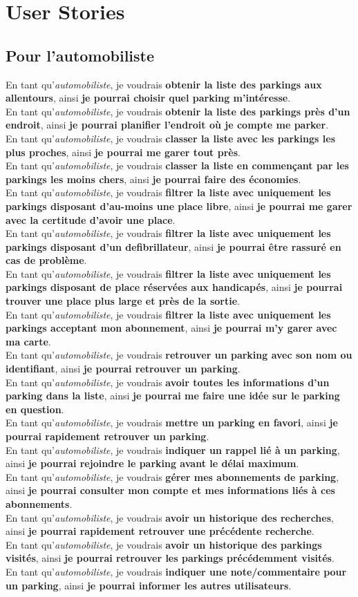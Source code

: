 \documentclass[a4paper,11pt]{article}
\newcommand{\userstory}[3]{En tant #1, je voudrais \textbf{#2}, ainsi \textbf{#3}.\\}
\newcommand{\etauto}[2]{\userstory{qu'\textit{automobiliste}}{#1}{#2}}
\begin{document}
\section{User Stories}
\subsection{Pour l'automobiliste}
  \noindent
  \etauto{obtenir la liste des parkings aux allentours}{je pourrai choisir quel parking m'intéresse}
  \etauto{obtenir la liste des parkings près d'un endroit}{je pourrai planifier l'endroit où je compte me parker}
  \etauto{classer la liste avec les parkings les plus proches}{je pourrai me garer tout près}
  \etauto{classer la liste en commençant par les parkings les moins chers}{je pourrai faire des économies}
  \etauto{filtrer la liste avec uniquement les parkings disposant d'au-moins une place libre}{je pourrai me garer avec la certitude d'avoir une place}
  \etauto{filtrer la liste avec uniquement les parkings disposant d'un defibrillateur}{je pourrai être rassuré en cas de problème}
  \etauto{filtrer la liste avec uniquement les parkings disposant de place réservées aux handicapés}{je pourrai trouver une place plus large et près de la sortie} %
  \etauto{filtrer la liste avec uniquement les parkings acceptant mon abonnement}{je pourrai m'y garer avec ma carte}
  \etauto{retrouver un parking avec son nom ou identifiant}{je pourrai retrouver un parking}
  \etauto{avoir toutes les informations d'un parking dans la liste}{je pourrai me faire une idée sur le parking en question}
  \etauto{mettre un parking en favori}{je pourrai rapidement retrouver un parking}
  \etauto{indiquer un rappel lié à un parking}{je pourrai rejoindre le parking avant le délai maximum}
  \etauto{gérer mes abonnements de parking}{je pourrai consulter mon compte et mes informations liés à ces abonnements}
  \etauto{avoir un historique des recherches}{je pourrai rapidement retrouver une précédente recherche}
  \etauto{avoir un historique des parkings visités}{je pourrai retrouver les parkings précédemment visités}
  \etauto{indiquer une note/commentaire pour un parking}{je pourrai informer les autres utilisateurs}
\end{document}

